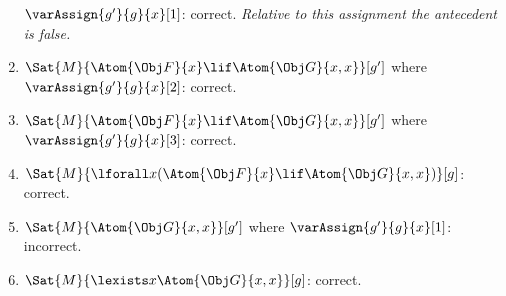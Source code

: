\documentclass[../../../../include/open-logic-section]{subfiles}
\begin{document}
\begin{prob}
\begin{ans}
\begin{enumerate}
	$\varAssign{g'}{g}{x}[1]$: correct. \emph{Relative to this assignment
	the antecedent is false.}
	\item $\Sat{M}{\Atom{\Obj F}{x}\lif \Atom{\Obj G}{x,x}}[g']$ where 
	$\varAssign{g'}{g}{x}[2]$: correct.
	\item $\Sat{M}{\Atom{\Obj F}{x}\lif \Atom{\Obj G}{x,x}}[g']$ where 
	$\varAssign{g'}{g}{x}[3]$: correct.
	\item $\Sat{M}{\lforall x(\Atom{\Obj F}{x}\lif \Atom{\Obj G}{x,x})}[g]$: correct.
	\item $\Sat{M}{\Atom{\Obj G}{x,x}}[g']$ where $\varAssign{g'}{g}{x}[1]$: incorrect.
	\item $\Sat{M}{\lexists x\Atom{\Obj G}{x,x}}[g]$: correct.
\end{enumerate}
\end{ans}
\end{prob}
\end{document}
